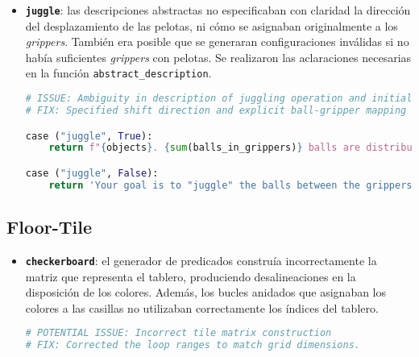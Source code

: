 \begin{anexes}
\begin{itemize}
    \item \textbf{\texttt{juggle}}: las descripciones abstractas no especificaban con claridad la dirección del desplazamiento de las pelotas, ni cómo se asignaban originalmente a los \textit{grippers}. También era posible que se generaran configuraciones inválidas si no había suficientes \textit{grippers} con pelotas. Se realizaron las aclaraciones necesarias en la función \texttt{abstract\_description}.

\begin{lstlisting}[language=Python, caption={Mejoras de claridad y validez en \texttt{GripperDatasetGenerator.abstract\_description} para \texttt{juggle}}, label={lst:gripper_juggle_text}, basicstyle=\ttfamily\small, frame=single]
# ISSUE: Ambiguity in description of juggling operation and initial state mapping.
# FIX: Specified shift direction and explicit ball-gripper mapping in description.

case ("juggle", True):
    return f"{objects}. {sum(balls_in_grippers)} balls are distributed across the same number of grippers (ball1 in gripper1, ball2 in gripper2... ball{sum(balls_in_grippers)} in gripper{sum(balls_in_grippers)}), and the rest are in the first room. The robby is in the first room."

case ("juggle", False):
    return 'Your goal is to "juggle" the balls between the grippers that started with balls, such that the balls are in the same grippers as before, but shifted by one, to the left. The remaining balls should remain untouched.'
\end{lstlisting}
\end{itemize}

\subsection*{Floor-Tile}

\begin{itemize}
    \item \textbf{\texttt{checkerboard}}: el generador de predicados construía incorrectamente la matriz que representa el tablero, produciendo desalineaciones en la disposición de los colores. Además, los bucles anidados que asignaban los colores a las casillas no utilizaban correctamente los índices del tablero.

\begin{lstlisting}[language=Python, caption={Corrección en generación de predicados para \texttt{checkerboard} en \texttt{FloorTileDatasetGenerator}}, label={lst:checkerboard_fix}, basicstyle=\ttfamily\small, frame=single]
# POTENTIAL ISSUE: Incorrect tile matrix construction
# FIX: Corrected the loop ranges to match grid dimensions.


\end{lstlisting}
\end{itemize}
\end{anexes}

